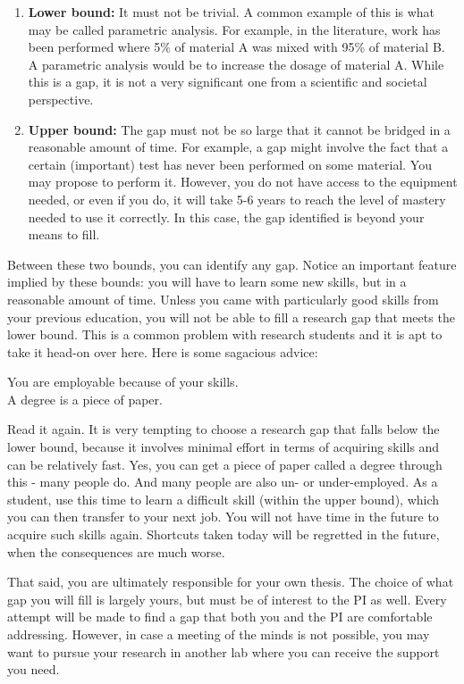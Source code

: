 \documentclass[12pt]{article}
\begin{document}
\begin{enumerate}
	\item \textbf{Lower bound:} It must not be trivial. A common example of this is what may be called parametric analysis. For example, in the literature, work has been performed where 5\% of material A was mixed with 95\% of material B. A parametric analysis would be to increase the dosage of material A. While this is a gap, it is not a very significant one from a scientific and societal perspective. 
	\item \textbf{Upper bound:} The gap must not be so large that it cannot be bridged in a reasonable amount of time. For example, a gap might involve the fact that a certain (important) test has never been performed on some material. You may propose to perform it. However, you do not have access to the equipment needed, or even if you do, it will take 5-6 years to reach the level of mastery needed to use it correctly. In this case, the gap identified is beyond your means to fill.
\end{enumerate}

Between these two bounds, you can identify any gap. Notice an important feature implied by these bounds: you will have to learn some new skills, but in a reasonable amount of time. Unless you came with particularly good skills from your previous education, you will not be able to fill a research gap that meets the lower bound. This is a common problem with research students and it is apt to take it head-on over here. Here is some sagacious advice:

\begin{center}
\large{You are employable because of your skills.\\ A degree is a piece of paper.}
\end{center}

Read it again. It is very tempting to choose a research gap that falls below the lower bound, because it involves minimal effort in terms of acquiring skills and can be relatively fast. Yes, you can get a piece of paper called a degree through this - many people do. And many people are also un- or under-employed. As a student, use this time to learn a difficult skill (within the upper bound), which you can then transfer to your next job. You will not have time in the future to acquire such skills again. Shortcuts taken today will be regretted in the future, when the consequences are much worse. 

That said, you are ultimately responsible for your own thesis. The choice of what gap you will fill is largely yours, but must be of interest to the PI as well. Every attempt will be made to find a gap that both you and the PI are comfortable addressing. However, in case a meeting of the minds is not possible, you may want to pursue your research in another lab where you can receive the support you need. 
\end{document}
